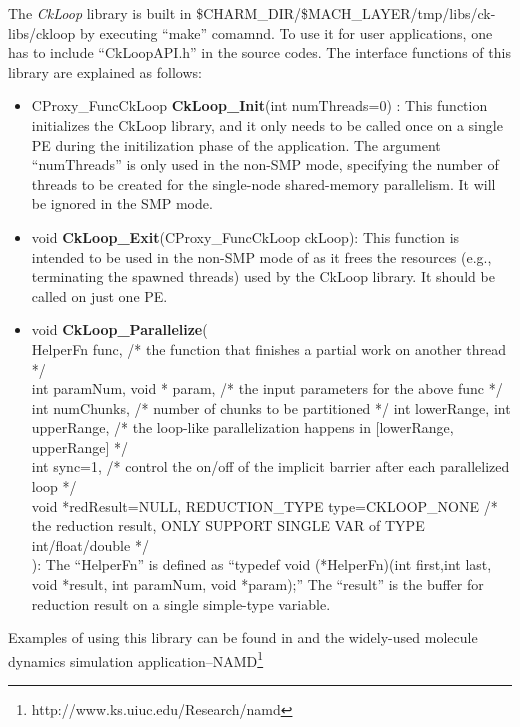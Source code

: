 The \emph{CkLoop} library is built in
\$CHARM\_DIR/\$MACH\_LAYER/tmp/libs/ck-libs/ckloop by executing ``make''
comamnd. To use it for user applications, one has to include ``CkLoopAPI.h'' in
the source codes. The interface functions of this library are explained as
follows: \begin{itemize} \item CProxy\_FuncCkLoop \textbf{CkLoop\_Init}(int
numThreads=0) : This function initializes the CkLoop library, and it only needs
to be called once on a single PE during the initilization phase of the
application.  The argument ``numThreads'' is only used in the \charmpp{}
non-SMP mode, specifying the number of threads to be created for the
single-node shared-memory parallelism. It will be ignored in the SMP mode.

\item void \textbf{CkLoop\_Exit}(CProxy\_FuncCkLoop ckLoop): This function is
intended to be used in the non-SMP mode of \charmpp{} as it frees the resources
(e.g., terminating the spawned threads) used by the CkLoop library. It should
be called on just one PE.

\item void \textbf{CkLoop\_Parallelize}( \\ HelperFn func, /* the function that
finishes a partial work on another thread */ \\ int paramNum, void * param, /*
the input parameters for the above func */ \\ int numChunks, /* number of
chunks to be partitioned */ int lowerRange, int upperRange, /* the loop-like
parallelization happens in [lowerRange, upperRange] */ \\ int sync=1, /*
control the on/off of the implicit barrier after each parallelized loop */ \\
void *redResult=NULL, REDUCTION\_TYPE type=CKLOOP\_NONE /* the reduction
result, ONLY SUPPORT SINGLE VAR of TYPE int/float/double */ \\): The
``HelperFn'' is defined as ``typedef void (*HelperFn)(int first,int last, void
*result, int paramNum, void *param);'' The ``result'' is the buffer for
reduction result on a single simple-type variable.  \end{itemize}

Examples of using this library can be found in  and the
widely-used molecule dynamics simulation
application--NAMD\footnote{http://www.ks.uiuc.edu/Research/namd}



